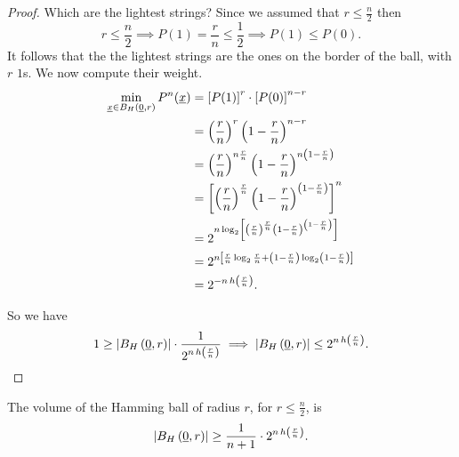 \begin{proof}
	Which are the lightest strings?
	Since we assumed that $r \leq \frac{n}{2}$ then
	\begin{equation*}
		r \le \frac{n}{2}
		\implies
		P(1) = \frac{r}{n} \le \frac{1}{2}
		\implies
		P(1) \le P(0).
	\end{equation*}
	It follows that the the lightest strings are the ones on the border of the ball, with $r$ $1$s. We now compute their weight.
	\begin{align*}
		\min_{\underline{x} \in B_H\left(\underline{0}, r\right)} P^n(\underline{x})
		& =
		\left[P(1)\right]^r \cdot \left[P(0)\right]^{n-r}
		\\
		& =
		\left(\frac{r}{n}\right)^r \left(1 - \frac{r}{n}\right)^{n-r}
		\\
		& =
		\left(\frac{r}{n}\right)^{n\frac{r}{n}} \left(1 - \frac{r}{n}\right)^{n\left(1 - \frac{r}{n}\right)}
		\\
		& =
		\left[\left(\frac{r}{n}\right)^{\frac{r}{n}} \left(1 - \frac{r}{n}\right)^{\left(1 - \frac{r}{n}\right)}\right]^n
		\\
		& =
		2^{n\log_2\left[\left(\frac{r}{n}\right)^{\frac{r}{n}}  \left(1 - \frac{r}{n}\right)^{\left(1 - \frac{r}{n}\right)}\right]}
		\\
		& =
		2^{n\left[\frac{r}{n}\log_2\frac{r}{n} + \left(1 - \frac{r}{n}\right)\log_2\left(1 - \frac{r}{n}\right)\right]}
		\\
		& =
		2^{-n \, h\left({\frac{r}{n}}\right)}.
	\end{align*}

	So we have 
	\begin{equation*}
		1
		\geq
		\left|{B_H\left(\underline{0}, r\right)}\right| \cdot \frac{1}{2^{n \, h\left({\frac{r}{n}}\right)}}
		\implies
		\left|{B_H\left(\underline{0}, r\right)}\right| \le 2^{n \, h\left({\frac{r}{n}}\right)}. \qedhere
	\end{equation*}
\end{proof}

\begin{thm}
	The volume of the Hamming ball of radius $r$, for $ r \leq \frac{n}{2}$, is
	\begin{equation*}
		\left|{B_H\left(\underline{0}, r\right)}\right|
		\ge
		\frac{1}{n+1} \cdot 2^{n \, h\left({\frac{r}{n}}\right)}.
	\end{equation*}
\end{thm}

